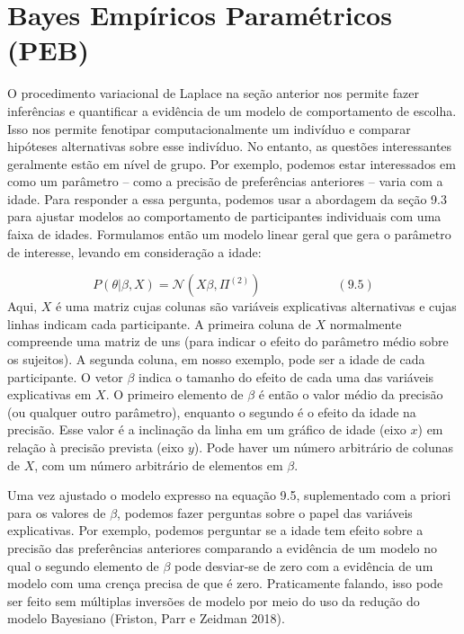 \documentclass[
  12pt,
]{book}
\begin{document}
\hypertarget{bayes-empuxedricos-paramuxe9tricos-peb}{%
\section{Bayes Empíricos Paramétricos (PEB)}\label{bayes-empuxedricos-paramuxe9tricos-peb}}

O procedimento variacional de Laplace na seção anterior nos permite fazer inferências e quantificar a evidência de um modelo de comportamento de escolha. Isso nos permite fenotipar computacionalmente um indivíduo e comparar hipóteses alternativas sobre esse indivíduo. No entanto, as questões interessantes geralmente estão em nível de grupo. Por exemplo, podemos estar interessados em como um parâmetro -- como a precisão de preferências anteriores -- varia com a idade. Para responder a essa pergunta, podemos usar a abordagem da seção 9.3 para ajustar modelos ao comportamento de participantes individuais com uma faixa de idades. Formulamos então um modelo linear geral que gera o parâmetro de interesse, levando em consideração a idade:

\[ P(\theta| \beta, X) = \mathcal N(X\beta, \Pi^{(2)}) \qquad\qquad\qquad (9.5) \]
Aqui, \(X\) é uma matriz cujas colunas são variáveis explicativas alternativas e cujas linhas indicam cada participante. A primeira coluna de \(X\) normalmente compreende uma matriz de uns (para indicar o efeito do parâmetro médio sobre os sujeitos). A segunda coluna, em nosso exemplo, pode ser a idade de cada participante. O vetor \(\beta\) indica o tamanho do efeito de cada uma das variáveis explicativas em \(X\). O primeiro elemento de \(\beta\) é então o valor médio da precisão (ou qualquer outro parâmetro), enquanto o segundo é o efeito da idade na precisão. Esse valor é a inclinação da linha em um gráfico de idade (eixo \(x\)) em relação à precisão prevista (eixo \(y\)). Pode haver um número arbitrário de colunas de \(X\), com um número arbitrário de elementos em \(\beta\).

Uma vez ajustado o modelo expresso na equação 9.5, suplementado com a priori para os valores de \(\beta\), podemos fazer perguntas sobre o papel das variáveis explicativas. Por exemplo, podemos perguntar se a idade tem efeito sobre a precisão das preferências anteriores comparando a evidência de um modelo no qual o segundo elemento de \(\beta\) pode desviar-se de zero com a evidência de um modelo com uma crença precisa de que é zero. Praticamente falando, isso pode ser feito sem múltiplas inversões de modelo por meio do uso da redução do modelo Bayesiano (Friston, Parr e Zeidman 2018).
\end{document}
